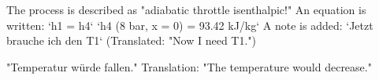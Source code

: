 The process is described as "adiabatic throttle isenthalpic!"  
An equation is written:  
`h1 = h4`  
`h4 (8 bar, x = 0) = 93.42 kJ/kg`  
A note is added:  
`Jetzt brauche ich den T1` (Translated: "Now I need T1.")

"Temperatur würde fallen."  
Translation: "The temperature would decrease."